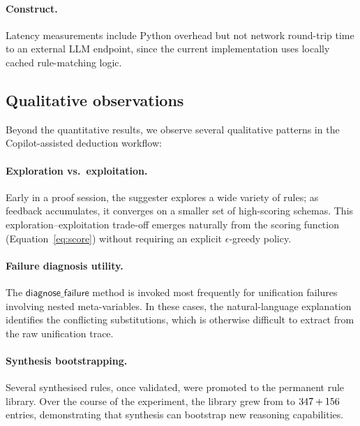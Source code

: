 \documentclass[11pt]{article}
\newcommand{\LLM}{\textsc{LLM}}
\newcommand{\diagnoseFailure}{\ensuremath{\mathsf{diagnose\_failure}}}
\begin{document}
\paragraph{Construct.}
Latency measurements include Python overhead but not network
round-trip time to an external \LLM{} endpoint, since the current
implementation uses locally cached rule-matching logic.

\subsection{Qualitative observations}\label{ssec:qualitative}

Beyond the quantitative results, we observe several qualitative
patterns in the Copilot-assisted deduction workflow:

\paragraph{Exploration vs.\ exploitation.}
Early in a proof session, the suggester explores a wide variety
of rules; as feedback accumulates, it converges on a smaller set
of high-scoring schemas.  This exploration--exploitation trade-off
emerges naturally from the scoring function
(Equation~\eqref{eq:score}) without requiring an explicit
$\epsilon$-greedy policy.

\paragraph{Failure diagnosis utility.}
The $\diagnoseFailure$ method is invoked most frequently for
unification failures involving nested meta-variables.  In these
cases, the natural-language explanation identifies the conflicting
substitutions, which is otherwise difficult to extract from the
raw unification trace.

\paragraph{Synthesis bootstrapping.}
Several synthesised rules, once validated, were promoted to the
permanent rule library.  Over the course of the experiment, the
library grew from \ppLXXXVIIruleLibrarySize{} to
$347 + 156$
entries, demonstrating that synthesis can bootstrap new reasoning
capabilities.

\end{document}
